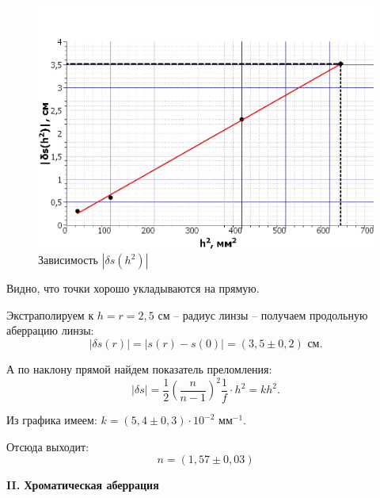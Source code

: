 \documentclass[a4paper,12pt]{article} %
\begin{document}
\begin{enumerate}
		\begin{figure}[h!]
			\centering
			\includegraphics[scale=0.7]{Pictures/d(h)}
			\caption{Зависимость $|\delta s(h^2)|$}
		\end{figure}
	
		Видно, что точки хорошо укладываются на прямую.
		
		Экстраполируем к $h = r = 2,5$ см -- радиус линзы -- получаем продольную аберрацию линзы:
		\begin{equation*}
			|\delta s(r)| = |s(r) - s(0)| = (3,5 \pm 0,2)\text{ см}.
		\end{equation*}
	
		А по наклону прямой найдем показатель преломления:
		\begin{equation*}
			|\delta s| = \frac{1}{2}\left(\frac{n}{n - 1}\right)^2\frac{1}{f} \cdot h^2 = kh^2.
		\end{equation*}
		
		Из графика имеем: $k = (5,4 \pm 0,3)\cdot 10^{-2} \text{ мм}^{-1}$.
		
		Отсюда выходит: 
		\begin{equation*}
			\boxed{n = (1,57 \pm 0,03)}
		\end{equation*}

		
	\end{enumerate}

	\begin{center}
		\textbf{II. Хроматическая аберрация}
	\end{center}
\end{document}
